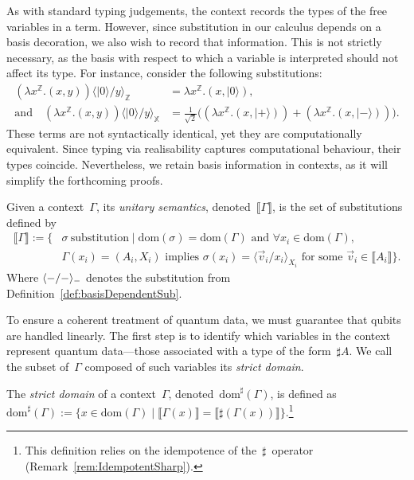 \documentclass[a4paper,UKenglish,numberwithinsect,pdfa,anonymous]{lipics-v2021}
\theoremstyle{restatestyle}
\newcommand\ket[1]{\ensuremath{|#1\rangle}}
\newcommand\ansubst[2]{\ensuremath{\langle #1 \rangle_{#2}}}
\newcommand\dom[1]{\mathrm{dom}(#1)}
\newcommand\sdom[1]{\mathrm{dom}^{\sharp}(#1)}
\def\Pair#1#2{(#1,#2)} %
\def\Lam#1#2#3{\lambda#1^{#2}{.}#3} %
\def\sem#1{\llbracket#1\rrbracket}
\newcommand\B{\mathbb Z}
\newcommand\XB{\mathbb X}
\begin{document}
As with standard typing judgements, the context records the types of the free
variables in a term. However, since substitution in our calculus depends on a basis
decoration, we also wish to record that information. This is not strictly necessary,
as the basis with respect to which a variable is interpreted should not affect its
type. For instance, consider the following substitutions:
\begin{align*}
(\Lam{x}{\B}{\Pair{x}{y}})\ansubst{\ket{0}/y}{\B}
  &= \Lam{x}{\B}{\Pair{x}{\ket{0}}},\\
\text{and}\quad
(\Lam{x}{\B}{(x, y)})\ansubst{\ket{0}/y}{\XB}
  &= \tfrac{1}{\sqrt{2}}
    \bigl((\Lam{x}{\B}{\Pair{x}{\ket{+}}})
         + (\Lam{x}{\B}{\Pair{x}{\ket{-}}})\bigr).
\end{align*}
These terms are not syntactically identical, yet they are computationally
equivalent. 
Since typing via realisability captures computational behaviour,
their types coincide. Nevertheless, we retain basis information in contexts, as
it will simplify the forthcoming proofs.

\begin{definition}
  Given a context~$\Gamma$, its \emph{unitary semantics},
  denoted~$\sem{\Gamma}$, is the set of substitutions defined by
  \begin{align*}
    \sem{\Gamma}
    := 
    \{&\sigma~\text{substitution} \mid 
      \dom{\sigma} = \dom{\Gamma}
      \text{ and } \forall {x_i} \in \dom{\Gamma},\\
      &\Gamma(x_i) = (A_i, X_i)
      \text{ implies }
      \sigma(x_i) = \ansubst{\vec{v}_{i}/x_i}{{X_i}}
      \text{ for some }\vec{v}_{i} \in \sem{A_i}\}.
  \end{align*}
  Where $\ansubst{\--/\--}{\--}$ denotes the substitution from 
  Definition~\ref{def:basisDependentSub}.
\end{definition}


To ensure a coherent treatment of quantum data, we must guarantee that qubits
are handled linearly. The first step is to identify which variables in the
context represent quantum data---those associated with a type of the
form~$\sharp A$. We call the subset of~$\Gamma$ composed of such variables its
\emph{strict domain}.

\begin{definition}
  The \emph{strict domain} of a context~$\Gamma$, denoted~$\sdom{\Gamma}$, is
  defined as
  \(
    \sdom{\Gamma} :=
    \{x \in \dom{\Gamma} \mid
    \sem{\Gamma(x)} = \sem{\sharp(\Gamma(x))}\}
  \).\footnote{This definition relies on the idempotence of the~$\sharp$~operator (Remark~\ref{rem:IdempotentSharp}).
  }
\end{definition}
\end{document}
